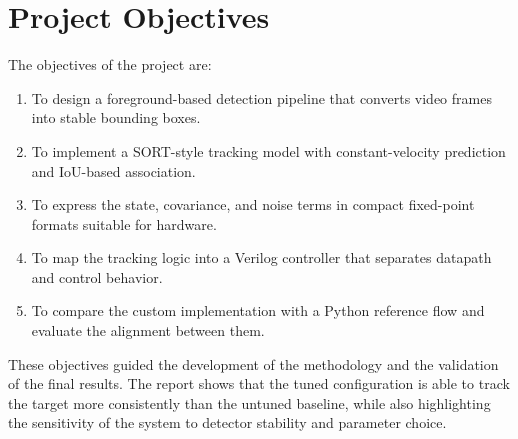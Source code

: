 \section{Project Objectives}
\label{section:proj_obj}
The objectives of the project are:
\begin{enumerate}
\item To design a foreground-based detection pipeline that converts video frames into stable bounding boxes.
\item To implement a SORT-style tracking model with constant-velocity prediction and IoU-based association.
\item To express the state, covariance, and noise terms in compact fixed-point formats suitable for hardware.
\item To map the tracking logic into a Verilog controller that separates datapath and control behavior.
\item To compare the custom implementation with a Python reference flow and evaluate the alignment between them.
\end{enumerate}

These objectives guided the development of the methodology and the validation of the final results. The 
report shows that the tuned configuration is able to track the target more consistently than the untuned 
baseline, while also highlighting the sensitivity of the system to detector stability and parameter choice.